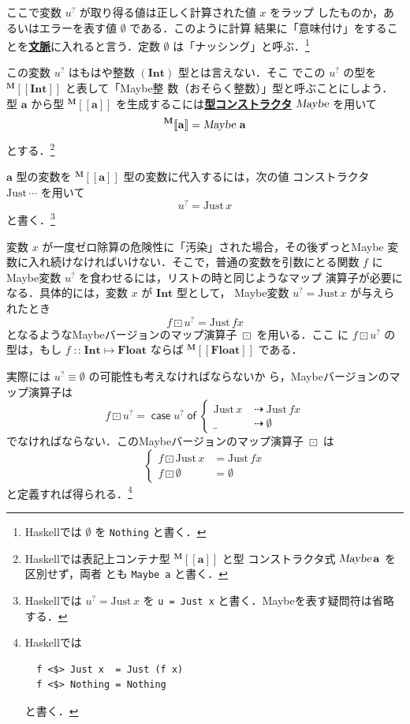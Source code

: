 \documentclass[a5paper,twoside,fleqn,draft]{jsbook}
\def\[{[\![}
\def\]{]\!]}
\newcommand{\programminglanguage}[1]{\textsf{#1}}
\newcommand{\haskell}{\programminglanguage{Haskell}}
\newcommand{\keyword}[1]{{\underline{\textbf{#1}}}}
\newcommand{\code}[1]{\texttt{#1}}
\newcommand{\mKeyword}[1]{\mathsf{#1}}
\newcommand{\mCaseKeyword}{\mKeyword{case}}
\newcommand{\mOfKeyword}{\mKeyword{of}}
\DeclareMathOperator{\mCaseKW}{\mCaseKeyword}
\DeclareMathOperator{\mOfKW}{\mOfKeyword}
\newcommand{\mNothing}{\emptyset}
\DeclareMathOperator{\mIfSo}{\dashrightarrow}
\DeclareMathOperator{\mIn}{{:\!:}}
\DeclareMathOperator{\mMapMaybe}{\boxdot}
\DeclareMathOperator{\mMapsTo}{\mapsto}
\newcommand{\mType}[1]{\mathbf{#1}} %
\newcommand{\mA}{\mType{a}}
\newcommand{\mFloatType}{\mType{Float}}
\newcommand{\mIntType}{\mType{Int}}
\newcommand{\mTypeAssemble}[2]{{}^\mType{#1}\[\mType{#2}\]}
\newcommand{\mMaybeType}[1]{\mTypeAssemble{M}{#1}}
\newcommand{\mTypeConstructor}[1]{\textsl{#1}}
\DeclareMathOperator{\mMaybeTypeConstructor}{\mTypeConstructor{Maybe}}
\newcommand{\mValueConstructor}[1]{\mathrm{#1}}
\newcommand{\mValueWith}[2]{\mValueConstructor{#1}\,#2}
\newcommand{\mJustWith}[1]{\mValueWith{Just}{#1}}
\newcommand{\mMaybe}[1]{{#1}^?}
\newcommand{\mCaseOf}[1]{\mCaseKW#1\mOfKW}
\newcommand{\mProjEXP}[2]{#1\mMapsTo#2} %
\begin{document}
ここで変数 $\mMaybe{u}$ が取り得る値は正しく計算された値 $x$ をラップ
したものか，あるいはエラーを表す値 $\mNothing$ である．このように計算
結果に「意味付け」をすることを\keyword{文脈}に入れると言う．定数
$\mNothing$ は「ナッシング」と呼ぶ．\footnote{\haskell では
  $\mNothing$ を \code{Nothing} と書く．}

この変数 $\mMaybe{u}$ はもはや整数 $(\mIntType)$ 型とは言えない．そこ
でこの $\mMaybe{u}$ の型を $\mMaybeType{\mIntType}$ と表して「Maybe整
  数（おそらく整数）」型と呼ぶことにしよう．型 $\mA $ から型
$\mMaybeType{a}$ を生成するこには\keyword{型コンストラクタ}
$\mMaybeTypeConstructor$ を用いて
\begin{equation}
  \mMaybeType{a}
  =\mMaybeTypeConstructor\,\mA
\end{equation}
とする．\footnote{\haskell では表記上コンテナ型 $\mMaybeType{a}$ と型
  コンストラクタ式 $\mMaybeTypeConstructor\mA$ を区別せず，両者
  とも \code{Maybe a} と書く．}

$\mA $ 型の変数を $\mMaybeType{a}$ 型の変数に代入するには，次の値
コンストラクタ $\mJustWith{\dotsb}$ を用いて
\begin{equation}
  \mMaybe{u}
  =\mJustWith{x}
\end{equation}
と書く．\footnote{\haskell では $\mMaybe{u}=\mJustWith{x}$ を \code{u
    = Just x} と書く．Maybeを表す疑問符は省略する．}

変数 $x$ が一度ゼロ除算の危険性に「汚染」された場合，その後ずっとMaybe
変数に入れ続けなければいけない．そこで，普通の変数を引数にとる関数 $f$
にMaybe変数 $\mMaybe{u}$ を食わせるには，リストの時と同じようなマップ
演算子が必要になる．具体的には，変数 $x$ が $\mType{Int}$ 型として，
Maybe変数 $\mMaybe{u}=\mJustWith{x}$ が与えられたとき
\begin{equation}
  f\mMapMaybe\mMaybe{u}
  =\mJustWith{fx}
\end{equation}
となるようなMaybeバージョンのマップ演算子 $\mMapMaybe$ を用いる．ここ
に $f\mMapMaybe\mMaybe{u}$ の型は，もし
$f\mIn\mProjEXP{\mIntType}{\mFloatType}$ ならば
$\mMaybeType{\mFloatType}$ である．

実際には $\mMaybe{u}\equiv\mNothing$ の可能性も考えなければならないか
ら，Maybeバージョンのマップ演算子は
\begin{equation}
  f\mMapMaybe\mMaybe{u}
  =\mCaseOf{\mMaybe{u}}
  \begin{cases}
    \mJustWith{x}
    &\mIfSo\mJustWith{fx}\\
    \_
    &\mIfSo\mNothing
  \end{cases}
\end{equation}
でなければならない．このMaybeバージョンのマップ演算子 $\mMapMaybe$ は
\begin{equation}
  \left\{
  \begin{aligned}
    f\mMapMaybe\mJustWith{x}
    &=\mJustWith{fx}\\
    f\mMapMaybe\mNothing
    &=\mNothing
  \end{aligned}
  \right.
\end{equation}
と定義すれば得られる．\footnote{\haskell では
\begin{verbatim}
  f <$> Just x  = Just (f x)
  f <$> Nothing = Nothing
\end{verbatim}
と書く．}
\end{document}
